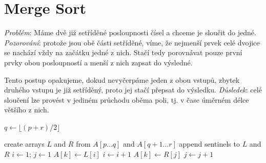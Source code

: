 \documentclass[openany,12pt,a4paper]{book}
\begin{document}
\section{Merge Sort}
\emph{Problém}: Máme dvě již setříděné posloupnosti čísel a chceme je sloučit do jedné.
\emph{Pozorování}:
protože jsou obě části setříděné, víme, že nejmenší prvek celé dvojice se nachází vždy
na začátku jedné z nich. Stačí tedy porovnávat pouze první prvky obou posloupností a menší z nich zapsat
do výsledné.

Tento postup opakujeme, dokud nevyčerpáme jeden z obou vstupů,
zbytek druhého vstupu je již setříděný, proto jej stačí přepsat do výsledku.
\emph{Důsledek}:
celé sloučení lze provést v jediném průchodu oběma poli, tj. v čase úměrném délce většího z nich.

\begin{algorithm}[H]
\caption{Merge-Sort}
\begin{algorithmic}[1]
        \State $q \gets \lfloor (p + r)/2 \rfloor$
        \State {}
        \State {}
        \State {}
    \EndIf
\EndProcedure

    \State create arrays $L$ and $R$ from $A[p \dots q]$ and $A[q+1 \dots r]$
    \State append sentinels to $L$ and $R$
    \State $i \gets 1$; $j \gets 1$
            \State $A[k] \gets L[i]$
            \State $i \gets i + 1$
        \Else
            \State $A[k] \gets R[j]$
            \State $j \gets j + 1$
        \EndIf
    \EndFor
\EndProcedure
\end{algorithmic}
\end{algorithm}
\end{document}
